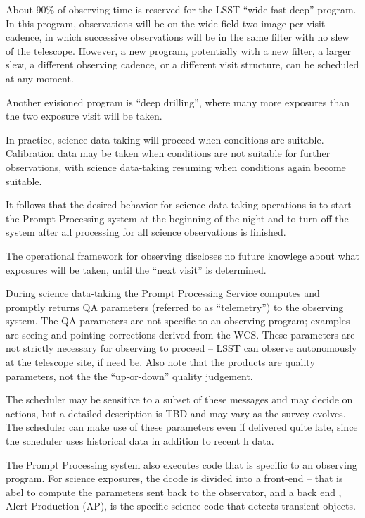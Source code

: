 About 90\% of observing time is reserved for the LSST “wide-fast-deep”
program. In this program, observations will be on the wide-field
two-image-per-visit cadence, in which successive observations will be
in the same filter with no slew of the telescope. However, a new
program, potentially with a new filter, a larger slew, a different
observing cadence, or a different visit structure, can be scheduled at
any moment.

Another evisioned program is ``deep drilling'', where many more exposures
than the two exposure visit will be taken.

In practice, science data-taking will proceed when conditions are
suitable. Calibration data may be taken when conditions are not
suitable for further observations, with science data-taking resuming
when conditions again become suitable.

It follows that the desired behavior for science data-taking
operations is to start the Prompt Processing system at the beginning
of the night and to turn off the system after all processing for all
science observations is finished.

The operational framework for observing discloses no future knowlege
about what exposures will be taken, until the “next visit” is
determined.

During science data-taking the Prompt Processing Service computes and
promptly returns QA parameters (referred to as “telemetry”) to the
observing system. The QA parameters are not specific to an observing
program; examples are seeing and pointing corrections derived from the
WCS. These parameters are not strictly necessary for observing to
proceed -- LSST can observe autonomously at the telescope site, if
need be. Also note that the products are quality parameters, not the
the “up-or-down” quality judgement.

The scheduler may be sensitive to a subset of these messages and may
decide on actions, but a detailed description is TBD and may vary as
the survey evolves. The scheduler can make use of these parameters even
if delivered quite late, since the scheduler uses historical data
in addition to recent h data.

The Prompt Processing system also executes code that is specific to an
observing program. For science exposures, the dcode is divided into
a front-end -- that is abel to compute the parameters sent back  to the
observator, and a back end , Alert Production (AP), is the specific
science code that detects transient objects.


